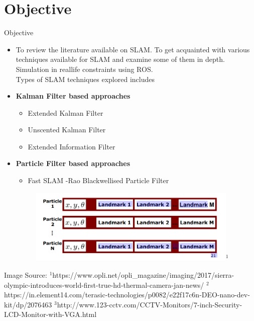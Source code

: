 \documentclass{beamer}
\begin{document}
\section{Objective}
\begin{frame}{Objective}
    \begin{itemize}
        \item To review the literature available on SLAM. To get acquainted with various techniques available for SLAM and examine some of them in depth. Simulation in reallife constraints using ROS.\\
            Types of SLAM techniques explored includes
        \item \textbf{Kalman Filter based approaches}
            \begin{itemize}
                \item Extended Kalman Filter
                \item Unscented Kalman Filter
                \item Extended Information Filter
            \end{itemize}
            \item \textbf{Particle Filter based approaches}
                \begin{itemize}
                    \item Fast SLAM -Rao Blackwellised Particle Filter
                \end{itemize}
                \begin{figure}[H]
        \centering
        \includegraphics[width = 100mm]{RBPF_SLAM.png}$^{1}$
        \end{figure}
    \end{itemize}
\vfill
\tiny Image Source:
\newline \tiny{$^{1}$}https://www.opli.net/opli\_magazine/imaging/2017/sierra-olympic-introduces-world-first-true-hd-thermal-camera-jan-news/
\newline \tiny{$^{2}$}https://in.element14.com/terasic-technologies/p0082/e22f17c6n-DEO-nano-dev-kit/dp/2076463
\newline \tiny{$^{3}$}http://www.123-cctv.com/CCTV-Monitors/7-inch-Security-LCD-Monitor-with-VGA.html
\end{frame}
\end{document}
